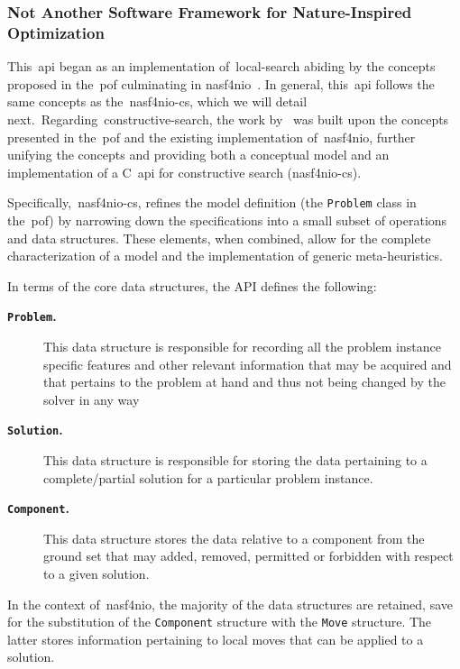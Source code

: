 \subsubsection*{Not Another Software Framework for Nature-Inspired Optimization}

This~\acrshort{api} began as an implementation of~\acrshort{local-search}
abiding by the concepts proposed in the~\acrshort{pof} culminating in
\acrshort{nasf4nio}~\cite{fonseca2021nasf4nio}. In general, this~\acrshort{api}
follows the same concepts as the~\acrshort{nasf4nio-cs}, which we will detail
next.~Regarding~\acrshort{constructive-search}, the work
by~\citet{outeiro2021application} was built upon the concepts presented in
the~\acrshort{pof} and the existing implementation of~\acrshort{nasf4nio},
further unifying the concepts and providing both a conceptual model and an
implementation of a C~\acrshort{api} for constructive search
(\acrshort{nasf4nio-cs}).

Specifically,~\acrshort{nasf4nio-cs}, refines the model definition (the
\texttt{Problem} class in the~\acrshort{pof}) by narrowing down the
specifications into a small subset of operations and data structures. These
elements, when combined, allow for the complete characterization of a model and
the implementation of generic meta-heuristics.

In terms of the core data structures, the API defines the following:

\begin{description}
      \item[\textbf{\texttt{Problem}.}] This data structure is responsible for recording
            all the problem instance specific features and other relevant information
            that may be acquired and that pertains to the problem at hand and thus not
            being changed by the solver in any way
      \item[\textbf{\texttt{Solution}.}] This data structure is responsible for storing the
            data pertaining to a complete/partial solution for a particular problem
            instance.
      \item[\textbf{\texttt{Component}.}] This data structure stores the data
            relative to a component from the ground set that may added, removed,
            permitted or forbidden with respect to a given solution.
\end{description}

In the context of~\acrshort{nasf4nio}, the majority of the data structures are
retained, save for the substitution of the \texttt{Component} structure with the
\texttt{Move} structure. The latter stores information pertaining to local moves
that can be applied to a solution.

